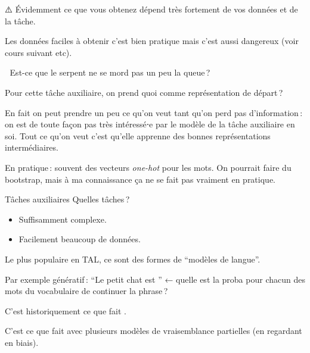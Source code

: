 \documentclass[
	xcolor={svgnames},
	aspectratio=169,
	french,
]{beamer}
\begin{document}
\begin{frame}{⚠️}
	Évidemment ce que vous obtenez dépend très fortement de vos données et de la tâche.

	\pause

	Les données faciles à obtenir c'est bien pratique mais c'est aussi dangereux (voir cours suivant etc).
\end{frame}

\begin{frame}{🐍}
	Est-ce que le serpent ne se mord pas un peu la queue ?

	\pause

	Pour cette tâche auxiliaire, on prend quoi comme représentation de départ ?

	\pause

	En fait on peut prendre un peu ce qu'on veut tant qu'on perd pas d'information : on est de toute façon pas très intéressé⋅e par le modèle de la tâche auxiliaire en soi. Tout ce qu'on veut c'est qu'elle apprenne des bonnes représentations intermédiaires.

	\pause

	En pratique : souvent des vecteurs \emph{one-hot} pour les mots. On pourrait faire du bootstrap, mais à ma connaissance ça ne se fait pas vraiment en pratique.
\end{frame}

\begin{frame}{Tâches auxiliaires}
	Quelles tâches ?

	\pause

	\begin{itemize}[<+->]
		\item Suffisamment complexe.
		\item Facilement beaucoup de données.
	\end{itemize}

	\pause

	Le plus populaire en TAL, ce sont des formes de \enquote{\alert{modèles de langue}}.

	\pause

	Par exemple génératif : \enquote{Le petit chat est \textunderscore\textunderscore\textunderscore} ← quelle est la proba pour chacun des mots du vocabulaire de continuer la phrase ?

	\pause

	C'est historiquement ce que fait \textcite{bengio2006NeuralProbabilisticLanguage}.
	
	\pause
	
	C'est ce que fait \textcite{mikolov2013EfficientEstimationWord} avec plusieurs modèles de vraisemblance partielles (en regardant en biais).
\end{frame}
\end{document}
